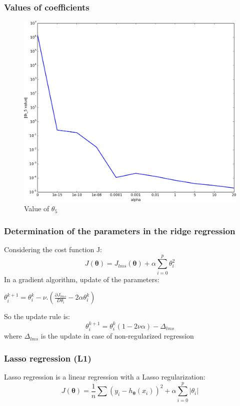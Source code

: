\documentclass[handout, 10pt]{beamer}
\begin{document}
\begin{frame}
\frametitle{Values of coefficients}
\vspace{-2em}
\begin{table}
\resizebox{\textwidth}{!}{%
}
\end{table}
\begin{figure}
\includegraphics[height=0.4\textheight]{./coefs_th5_ridge.png}\\
Value of $\theta_5$
\end{figure}
\end{frame}

\begin{frame}
\frametitle{Determination of the parameters in the ridge regression}
Considering the cost function J:
$$
J(\bm{\theta}) =J_{lms}(\bm{\theta}) + \alpha \sum_{i=0}^p \theta_i^2
$$
In a gradient algorithm, update of the parameters:

$\theta^{k+1}_i = \theta^k_i - \nu.(\frac{\partial J_{lms}}{D\theta_i} - 2\alpha\theta^k_i)$

So the update rule is:
$$
\theta^{k+1}_i = \theta^k_i(1-2 \nu \alpha) - \Delta_{lms}
$$
where
$\Delta_{lms}$ is the update in case of non-regularized regression

\end{frame}


\begin{frame}
\frametitle{Lasso regression (L1)}
\begin{block}{}
Lasso regression is a linear regression with a Lasso regularization:
$$
J(\bm{\theta}) = \frac{1}{n} \sum (y_i - h_{\bm{\theta}}(x_i))^2 + \alpha \sum_{i=0}^p |\theta_i|
$$
\end{block}
\end{frame}
\end{document}
